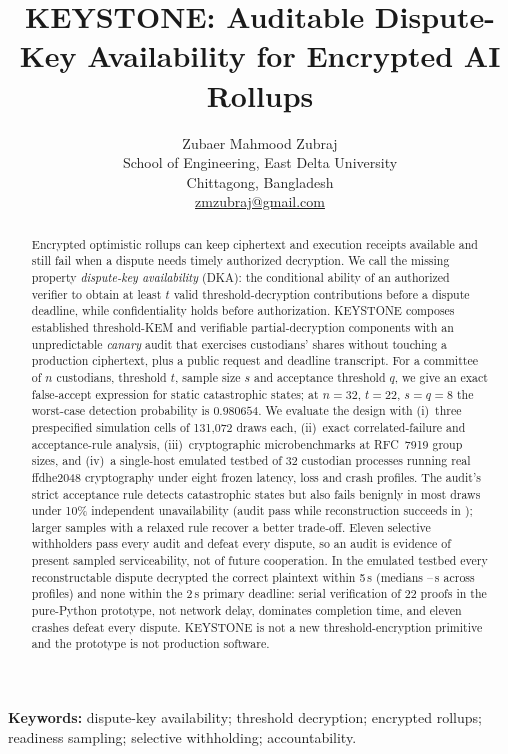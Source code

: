 \documentclass[10pt]{article}
\title{\textbf{KEYSTONE: Auditable Dispute-Key Availability for Encrypted AI Rollups}}
\author{
  Zubaer Mahmood Zubraj\\
  \small School of Engineering, East Delta University\\
  \small Chittagong, Bangladesh\\
  \small \href{mailto:zmzubraj@gmail.com}{zmzubraj@gmail.com}
}
\date{}
\begin{document}
\maketitle

\begin{abstract}
Encrypted optimistic rollups can keep ciphertext and execution receipts available and still fail when a dispute needs timely authorized decryption. We call the missing property \emph{dispute-key availability} (DKA): the conditional ability of an authorized verifier to obtain at least $t$ valid threshold-decryption contributions before a dispute deadline, while confidentiality holds before authorization. KEYSTONE composes established threshold-KEM and verifiable partial-decryption components with an unpredictable \emph{canary} audit that exercises custodians' shares without touching a production ciphertext, plus a public request and deadline transcript. For a committee of $n$ custodians, threshold $t$, sample size $s$ and acceptance threshold $q$, we give an exact false-accept expression for static catastrophic states; at $n=32$, $t=22$, $s=q=8$ the worst-case detection probability is $0.980654$. We evaluate the design with (i)~three prespecified simulation cells of 131{,}072 draws each, (ii)~exact correlated-failure and acceptance-rule analysis, (iii)~cryptographic microbenchmarks at RFC~7919 group sizes, and (iv)~a single-host emulated testbed of 32 custodian processes running real ffdhe2048 cryptography under eight frozen latency, loss and crash profiles. The audit's strict acceptance rule detects catastrophic states but also fails benignly in most draws under 10\% independent unavailability (audit pass \RIIDAudit{} while reconstruction succeeds in \RIIDRecon{}); larger samples with a relaxed rule recover a better trade-off. Eleven selective withholders pass every audit and defeat every dispute, so an audit is evidence of present sampled serviceability, not of future cooperation. In the emulated testbed every reconstructable dispute decrypted the correct plaintext within 5\,s (medians \RDLMedLo--\RDLMedHi\,s across profiles) and none within the 2\,s primary deadline: serial verification of 22 proofs in the pure-Python prototype, not network delay, dominates completion time, and eleven crashes defeat every dispute. KEYSTONE is not a new threshold-encryption primitive and the prototype is not production software.
\end{abstract}

\noindent\textbf{Keywords:} dispute-key availability; threshold decryption; encrypted rollups; readiness sampling; selective withholding; accountability.
\end{document}
